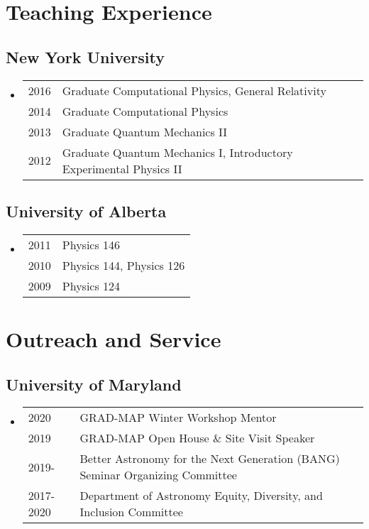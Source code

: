 \begin{itemize}
\end{itemize}

\section*{Teaching Experience}
\subsection*{New York University}
\begin{itemize}
\item \begin{tabular}{ll}
2016 & Graduate Computational Physics, General Relativity \\
2014 & Graduate Computational Physics \\
2013 & Graduate Quantum Mechanics II \\
2012 & Graduate Quantum Mechanics I, Introductory Experimental Physics II
\end{tabular}
\end{itemize}
\subsection*{University of Alberta}
\begin{itemize}
\item \begin{tabular}{ll}
2011 & Physics 146 \\
2010 & Physics 144, Physics 126 \\
2009 & Physics 124 \\
\end{tabular}
\end{itemize}

\section*{Outreach and Service}
\subsection*{University of Maryland}
\begin{itemize}
\item \begin{tabular}{ll}
2020			& GRAD-MAP Winter Workshop Mentor \\
2019			& GRAD-MAP Open House \& Site Visit Speaker \\
2019-		& Better Astronomy for the Next Generation (BANG) Seminar Organizing Committee \\
2017-2020 	& Department of Astronomy Equity, Diversity, and Inclusion Committee
\end{tabular}
\end{itemize}
